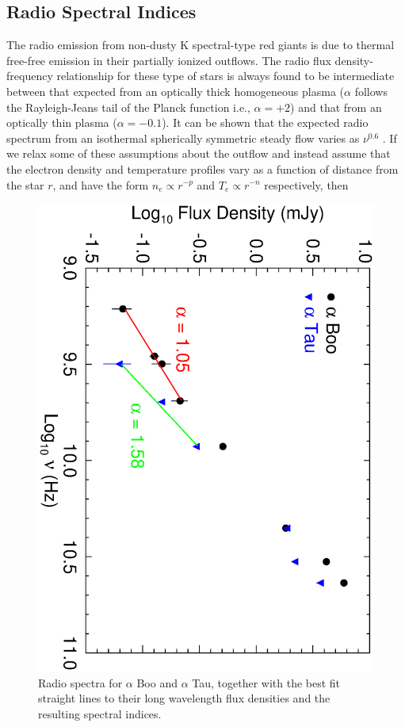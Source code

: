 \documentclass[iop]{emulateapj}
\begin{document}
\subsection{Radio Spectral Indices} \label{disc:disc3}
The radio emission from non-dusty K spectral-type red giants is due to thermal free-free emission in their partially ionized outflows. The radio flux density-frequency relationship for these type of stars is always found to be intermediate between that expected from an optically thick homogeneous plasma ($\alpha$ follows the Rayleigh-Jeans tail of the Planck function i.e., $\alpha = +2$) and that from an optically thin plasma ($\alpha = -0.1$).  It can be shown that the expected radio spectrum from an isothermal spherically symmetric steady flow varies as $\nu ^{0.6}$ \citep{1975MNRAS.170...41W,1975AA....39..217O,1975AA....39....1P}. If we relax some of these assumptions about the outflow and instead assume that the electron density and temperature profiles vary as a function of distance from the star $r$, and have the form $n_{e} \propto r^{-p}$ and $T_{e} \propto r^{-n}$ respectively, then 

\begin{figure}
\includegraphics[trim = 0mm 0mm 0mm 10mm, clip,scale=0.385,angle=90]{fig3.ps}
\caption{Radio spectra for $\alpha$ Boo and $\alpha$ Tau, together with the best fit straight lines to their long wavelength flux densities and the resulting spectral indices.}
\label{fig:fig3}
\end{figure}
\end{document}
